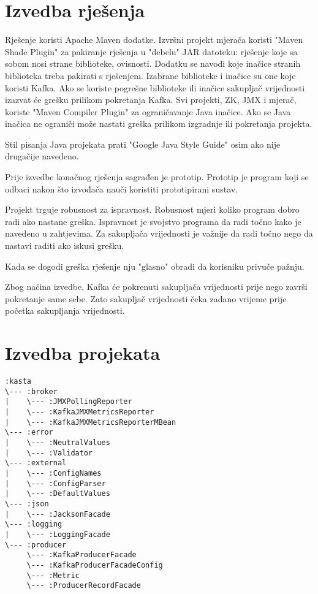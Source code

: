 \documentclass[utf8, diplomski, lmodern, numeric]{fer}
\begin{document}
\section{Izvedba rješenja}

Rješenje koristi Apache Maven dodatke. Izvršni projekt mjerača koristi "Maven Shade Plugin" za pakiranje rješenja u "debelu" JAR datoteku: rješenje koje sa sobom nosi strane biblioteke, ovisnosti. Dodatku se navodi koje inačice stranih biblioteka treba pakirati s rješenjem. Izabrane biblioteke i inačice su one koje koristi Kafka. Ako se koriste pogrešne biblioteke ili inačice sakupljač vrijednosti izazvat će grešku prilikom pokretanja Kafka. Svi projekti, ZK, JMX i mjerač, koriste "Maven Compiler Plugin" za ograničavanje Java inačice. Ako se Java inačica ne ograniči može nastati greška prilikom izgradnje ili pokretanja projekta.

Stil pisanja Java projekata prati "Google Java Style Guide" osim ako nije drugačije navedeno.

Prije izvedbe konačnog rješenja sagrađen je prototip. Prototip je program koji se odbaci nakon što izvođača nauči koristiti prototipirani sustav.

Projekt trguje robusnost za ispravnost. Robusnost mjeri koliko program dobro radi ako nastane greška. Ispravnost je svojstvo programa da radi točno kako je navedeno u zahtjevima. Za sakupljača vrijednosti je važnije da radi točno nego da nastavi raditi ako iskusi grešku.

Kada se dogodi greška rješenje nju "glasno" obradi da korisniku privuče pažnju. 

Zbog načina izvedbe, Kafka će pokrenuti sakupljača vrijednosti prije nego završi pokretanje same sebe. Zato sakupljač vrijednosti čeka zadano vrijeme prije početka sakupljanja vrijednosti.


\section{Izvedba projekata}

\begin{lstlisting}[floatplacement=H]
:kasta
\--- :broker
|    \--- :JMXPollingReporter
|    \--- :KafkaJMXMetricsReporter
|    \--- :KafkaJMXMetricsReporterMBean
\--- :error
|    \--- :NeutralValues
|    \--- :Validator
\--- :external
|    \--- :ConfigNames
|    \--- :ConfigParser
|    \--- :DefaultValues
\--- :json
|    \--- :JacksonFacade
\--- :logging
|    \--- :LoggingFacade
\--- :producer
     \--- :KafkaProducerFacade
     \--- :KafkaProducerFacadeConfig
     \--- :Metric
     \--- :ProducerRecordFacade
\end{lstlisting}
\end{document}
